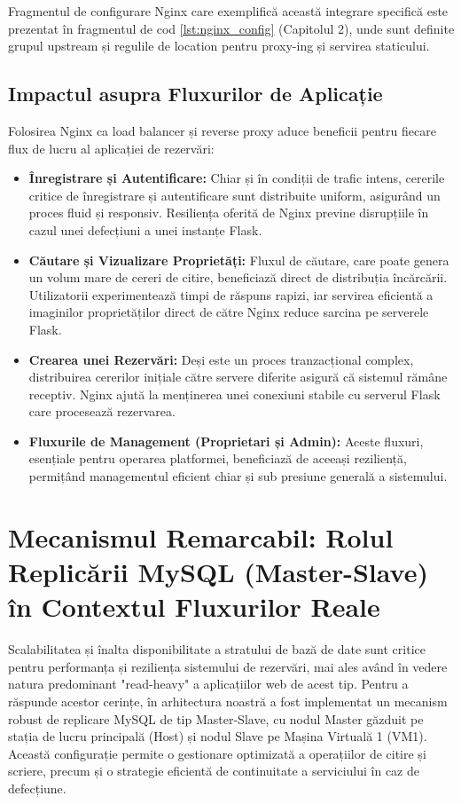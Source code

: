\documentclass[12pt, a4paper, oneside, romanian]{teza-upb}
\begin{document}
Fragmentul de configurare Nginx care exemplifică această integrare specifică este prezentat în fragmentul de cod \ref{lst:nginx_config} (Capitolul 2), unde sunt definite grupul upstream și regulile de location pentru proxy-ing și servirea staticului.

\subsection{Impactul asupra Fluxurilor de Aplicație}
Folosirea Nginx ca load balancer și reverse proxy aduce beneficii pentru fiecare flux de lucru al aplicației de rezervări:
\begin{itemize}
	\item \textbf{Înregistrare și Autentificare:} Chiar și în condiții de trafic intens, cererile critice de înregistrare și autentificare sunt distribuite uniform, asigurând un proces fluid și responsiv. Resiliența oferită de Nginx previne disrupțiile în cazul unei defecțiuni a unei instanțe Flask.
	
	\item \textbf{Căutare și Vizualizare Proprietăți:} Fluxul de căutare, care poate genera un volum mare de cereri de citire, beneficiază direct de distribuția încărcării. Utilizatorii experimentează timpi de răspuns rapizi, iar servirea eficientă a imaginilor proprietăților direct de către Nginx reduce sarcina pe serverele Flask.
	
	\item \textbf{Crearea unei Rezervări:} Deși este un proces tranzacțional complex, distribuirea cererilor inițiale către servere diferite asigură că sistemul rămâne receptiv. Nginx ajută la menținerea unei conexiuni stabile cu serverul Flask care procesează rezervarea.
	
	\item \textbf{Fluxurile de Management (Proprietari și Admin):} Aceste fluxuri, esențiale pentru operarea platformei, beneficiază de aceeași reziliență, permițând managementul eficient chiar și sub presiune generală a sistemului.
\end{itemize}


\section{Mecanismul Remarcabil: Rolul Replicării MySQL (Master-Slave) în Contextul Fluxurilor Reale}
Scalabilitatea și înalta disponibilitate a stratului de bază de date sunt critice pentru performanța și reziliența sistemului de rezervări, mai ales având în vedere natura predominant "read-heavy" a aplicațiilor web de acest tip. Pentru a răspunde acestor cerințe, în arhitectura noastră a fost implementat un mecanism robust de replicare MySQL de tip Master-Slave, cu nodul Master găzduit pe stația de lucru principală (Host) și nodul Slave pe Mașina Virtuală 1 (VM1). Această configurație permite o gestionare optimizată a operațiilor de citire și scriere, precum și o strategie eficientă de continuitate a serviciului în caz de defecțiune.
\end{document}
